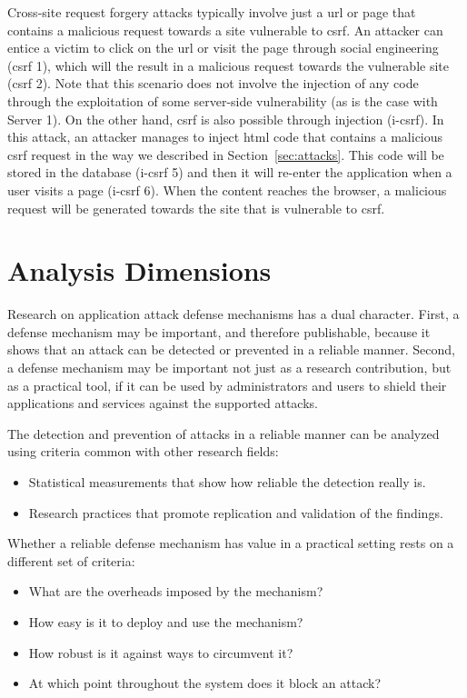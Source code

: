 \documentclass[conference]{IEEEtran}
\begin{document}
Cross-site request forgery attacks typically involve just a
{\sc url} or page that contains a malicious request towards
a site vulnerable to {\sc csrf}.
An attacker can entice a victim to click on the {\sc url} or visit the page
through social engineering ({\sc csrf} 1), which will the result in a malicious
request towards the vulnerable site ({\sc csrf} 2).
Note that this scenario does not involve the injection of any code through the
exploitation of some server-side vulnerability (as is the case with Server 1).
On the other hand, {\sc csrf} is also possible through injection
({\sc i-csrf}). In this attack, an attacker
manages to inject {\sc html} code that contains
a malicious {\sc csrf} request in the way we described in
Section~\ref{sec:attacks}.
This code will be stored
in the database ({\sc i-csrf} 5)
and then it will re-enter the application when
a user visits a page ({\sc i-csrf} 6). When the
content reaches the browser, a malicious request will be generated
towards the site that is vulnerable to {\sc csrf}.


\section{Analysis Dimensions}
\label{sec:dimensions}

Research on application attack defense mechanisms has a dual
character. First, a defense mechanism may be important, and therefore
publishable, because it shows that an attack can be detected or prevented in a
reliable manner. Second, a defense mechanism may be important not
just as a research contribution, but as a practical tool, if it can be
used by administrators and users to shield their applications
and services against the supported attacks.

The detection and prevention of attacks
in a reliable manner can be analyzed using
criteria common with other research fields:
\begin{itemize}
\item Statistical measurements that show how reliable the detection really
  is.
\item Research practices that promote replication and validation
of the findings.
\end{itemize}

Whether a reliable defense mechanism has value in a practical
setting rests on a different set of criteria:
\begin{itemize}
\item What are the overheads imposed by the mechanism?
\item How easy is it to deploy and use the mechanism?
\item How robust is it against ways to circumvent it?
\item At which point throughout the system does it block an attack?
\end{itemize}
\end{document}
